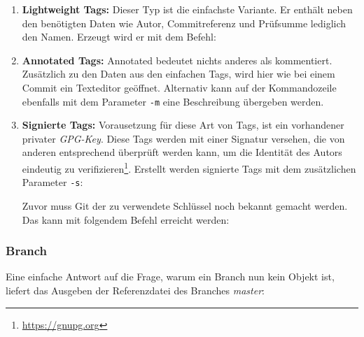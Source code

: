 \begin{enumerate}
\item \textbf{Lightweight Tags:} Dieser Typ ist die einfachste Variante. Er
enthält neben den benötigten Daten wie Autor, Commitreferenz und Prüfsumme
lediglich den Namen. Erzeugt wird er mit dem Befehl:



\item \textbf{Annotated Tags:} Annotated bedeutet nichts anderes als
kommentiert. Zusätzlich zu den Daten aus den einfachen Tags, wird hier wie bei
einem Commit ein Texteditor geöffnet. Alternativ kann auf der Kommandozeile
ebenfalls mit dem Parameter \texttt{-m} eine Beschreibung übergeben
werden.



\item \textbf{Signierte Tags:} Vorausetzung für diese Art von Tags, ist ein
vorhandener privater \textit{GPG-Key}. Diese Tags werden mit einer Signatur
versehen, die von anderen entsprechend überprüft werden kann, um die Identität
des Autors eindeutig zu verifizieren\footnote{\url{https://gnupg.org}}.
Erstellt werden signierte Tags mit dem zusätzlichen Parameter \texttt{-s}:



Zuvor muss Git der zu verwendete Schlüssel noch bekannt gemacht werden. Das
kann mit folgendem Befehl erreicht werden:


\end{enumerate}

\subsubsection{Branch}\label{sec:branchobject}
Eine einfache Antwort auf die Frage, warum ein Branch nun kein Objekt ist, liefert
das Ausgeben der Referenzdatei des Branches \textit{master}:



